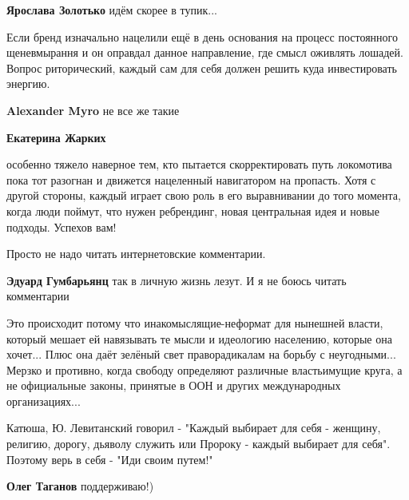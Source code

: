 \begin{itemize}
\begin{itemize} %
\textbf{Ярослава Золотько} идём скорее в тупик...
\end{itemize} %


Если бренд изначально нацелили ещё в день основания на процесс постоянного
щеневмырання и он оправдал данное направление, где смысл оживлять лошадей.
Вопрос риторический, каждый сам для себя должен решить куда инвестировать
энергию.

\begin{itemize} %
\textbf{Alexander Myro} не все же такие

\textbf{Екатерина Жарких} 

особенно тяжело наверное тем, кто пытается скорректировать путь локомотива пока
тот разогнан и движется нацеленный навигатором на пропасть. Хотя с другой
стороны, каждый играет свою роль в его выравнивании до того момента, когда люди
поймут, что нужен ребрендинг, новая центральная идея и новые подходы. Успехов
вам!

\end{itemize} %

Просто не надо читать интернетовские комментарии.

\begin{itemize} %
\textbf{Эдуард Гумбарьянц} так в личную жизнь лезут. И я не боюсь читать комментарии
\end{itemize} %


Это происходит потому что инакомыслящие-неформат для нынешней власти, который
мешает ей навязывать те мысли и идеологию населению, которые она хочет... Плюс
она даёт зелёный свет праворадикалам на борьбу с неугодными... Мерзко и
противно, когда свободу определяют различные властьимущие круга, а не официальные
законы, принятые в ООН и других международных организациях...


Катюша, Ю. Левитанский говорил - "Каждый выбирает для себя - женщину, религию,
дорогу, дьяволу служить или Пророку - каждый выбирает для себя". Поэтому верь в
себя - "Иди своим путем!"

\begin{itemize} %
\textbf{Олег Таганов} поддерживаю!)
\end{itemize} %


\end{itemize}
